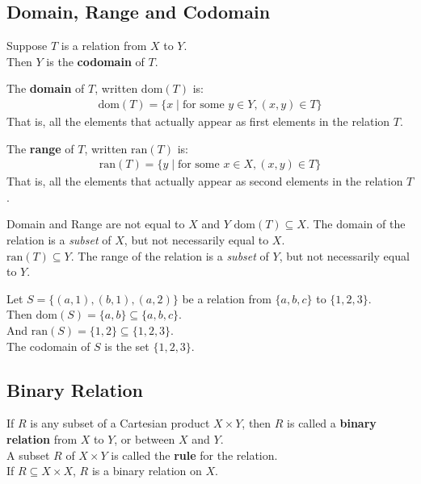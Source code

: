 \documentclass[../notes.tex]{subfiles}
\begin{document}
			\subsection{Domain, Range and Codomain}
				Suppose $T$ is a relation from $X$ to $Y$.\\
				Then $Y$ is the \textbf{codomain} of $T$.

				The \textbf{domain} of $T$, written $\mathrm{dom}(T)$ is:
					\begin{align*}
						\mathrm{dom}(T) = \{x \mid \text{for some } y \in Y, (x, y) \in T\}
					\end{align*}
				That is, all the elements that actually appear as first elements in the relation $T$.

				The \textbf{range} of $T$, written $\mathrm{ran}(T)$ is:
				\begin{align*}
					\mathrm{ran}(T) = \{y \mid \text{for some } x \in X, (x, y) \in T\}
				\end{align*}
			That is, all the elements that actually appear as second elements in the relation $T$.
			\begin{sidenote}{Domain and Range are not equal to $X$ and $Y$}
				$\mathrm{dom}(T) \subseteq X$. The domain of the relation is a \textit{subset} of $X$, but not necessarily equal to $X$.\\
				$\mathrm{ran}(T) \subseteq Y$. The range of the relation is a \textit{subset} of $Y$, but not necessarily equal to $Y$.
			\end{sidenote}
			\begin{example}
				Let $S = \bigl\{(a, 1), (b, 1), (a, 2)\bigr\}$ be a relation from $\{a, b, c\}$ to $\{1, 2, 3\}$.\\
				Then $\mathrm{dom}(S) = \{a, b\} \subseteq \{a, b, c\}$.\\
				And $\mathrm{ran}(S) = \{1, 2\} \subseteq \{1, 2, 3\}$.\\
				The codomain of $S$ is the set $\{1, 2, 3\}$. 
			\end{example}
			\subsection{Binary Relation}
				If $R$ is any subset of a Cartesian product $X \times Y$, then $R$ is called a \textbf{binary relation} from $X$ to $Y$, or between $X$ and $Y$.\\
				A subset $R$ of $X \times Y$ is called the \textbf{rule} for the relation.\\
				If $R \subseteq X \times X$, $R$ is a binary relation on $X$.
			\pagebreak
\end{document}
